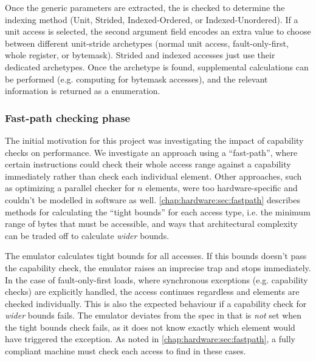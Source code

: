 Once the generic parameters are extracted, the  is checked to determine the indexing method (Unit, Strided, Indexed-Ordered, or Indexed-Unordered).
If a unit access is selected, the second argument field encodes an extra value to choose between different unit-stride archetypes (normal unit access, fault-only-first, whole register, or bytemask).
Strided and indexed accesses just use their dedicated archetypes.
Once the archetype is found, supplemental calculations can be performed (e.g. computing  for bytemask accesses), and the relevant information is returned as a  enumeration.


\subsubsection{Fast-path checking phase}\label{chap:hardware:subsec:checking}
The initial motivation for this project was investigating the impact of capability checks on performance.
We investigate an approach using a \enquote{fast-path}, where certain instructions could check their whole access range against a capability immediately rather than check each individual element.
Other approaches, such as optimizing a parallel checker for $n$ elements, were too hardware-specific and couldn't be modelled in software as well.
\cref{chap:hardware:sec:fastpath} describes methods for calculating the \enquote{tight bounds} for each access type, i.e. the minimum range of bytes that must be accessible, and ways that architectural complexity can be traded off to calculate \emph{wider} bounds.

The emulator calculates tight bounds for all accesses.
If this bounds doesn't pass the capability check, the emulator raises an imprecise trap and stops immediately.
In the case of fault-only-first loads, where synchronous exceptions (e.g. capability checks) are explicitly handled, the access continues regardless and elements are checked individually.
This is also the expected behaviour if a capability check for \emph{wider} bounds fails.
The emulator deviates from the spec in that  is \emph{not} set when the tight bounds check fails, as it does not know exactly which element would have triggered the exception.
As noted in \cref{chap:hardware:sec:fastpath}, a fully compliant machine must check each access to find  in these cases.

